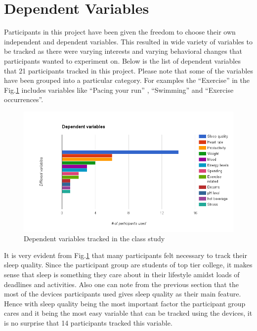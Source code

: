 \section{Dependent Variables}
Participants in this project have been given the freedom to choose their own independent and dependent variables. This resulted in wide variety of variables to be tracked as there were varying interests and varying behavioral changes that participants wanted to experiment on. Below is the list of dependent variables that 21 participants tracked in this project. Please note that some of the variables have been grouped into a particular category. For examples the \enquote{Exercise} in the Fig.\ref{fig:variables} includes variables like \enquote{Pacing your run}  , \enquote{Swimming} and \enquote{Exercise occurrences}.

\begin{figure}[!t]\centering
\includegraphics[width=1.0\columnwidth]{images/dependent_variables.png}
\caption{\footnotesize Dependent variables tracked in the class study \label{fig:variables} 
}%
\end{figure}
%
It is very evident from Fig.\ref{fig:variables} that many participants felt necessary to track their sleep quality. Since the participant group are students of top tier college, it makes sense that sleep is something they care about in their lifestyle amidst loads of deadlines and activities. Also one can note from the previous section that the most of the devices participants used gives sleep quality as their main feature. Hence with sleep quality being the most important factor the participant group cares and it being the most easy variable that can be tracked using the devices, it is no surprise that 14 participants tracked this variable. 

